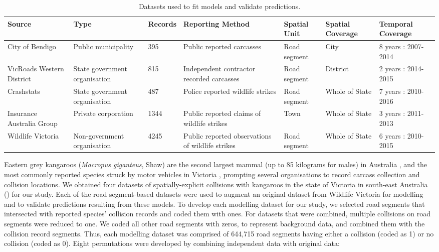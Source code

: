 \begin{table}[htp]
\caption[Datasets used to fit collision models and validate predictions]{Datasets used to fit models and validate predictions.}
\begin{tabularx}{\textwidth}{YYYYYYY} \toprule
Source						&Type							&Records	&Reporting Method	&Spatial Unit	&Spatial Coverage	&Temporal Coverage \\ \midrule
City of Bendigo				&Public municipality			&395		&Public reported carcasses			&Road segment		&City	&8 years : 2007-2014 \\
VicRoads Western District	&State government organisation	&815		&Independent contractor recorded  carcasses			&Road segment		&District	&2 years : 2014-2015 \\
Crashstats					&State government organisation	&487		&Police reported wildlife strikes			&Road segment		&Whole of State	&7 years : 2010-2016 \\
Insurance Australia Group	&Private corporation			&1344		&Public reported claims of wildlife strikes			&Town		&Whole of State	&3 years : 2011-2013 \\
Wildlife Victoria			&Non-government organisation	&4245		&Public reported observations of wildlife strikes			&Road segment		&Whole of State	&6 years : 2010-2015 \\
\bottomrule
\end{tabularx}
\label{val_data}
\end{table}

Eastern grey kangaroos (\textit{Macropus giganteus}, Shaw) are the second largest mammal (up to 85 kilograms for males) in Australia \citep{coul10}, and the most commonly reported species struck by motor vehicles in Victoria \citep{rowd08}, prompting several organisations to record carcass collection and collision locations. We obtained four datasets of spatially-explicit collisions with kangaroos in the state of Victoria in south-east Australia () for our study. Each of the road segment-based datasets were used to augment an original dataset from Wildlife Victoria for modelling and to validate predictions resulting from these models. To develop each modelling dataset for our study, we selected road segments that intersected with reported species’ collision records and coded them with ones. For datasets that were combined, multiple collisions on road segments were reduced to one. We coded all other road segments with zeros, to represent background data, and combined them with the collision record segments.  Thus, each modelling dataset was comprised of 644,715 road segments having either a collision (coded as 1) or no collision (coded as 0). Eight permutations were developed by combining independent data with original data:

